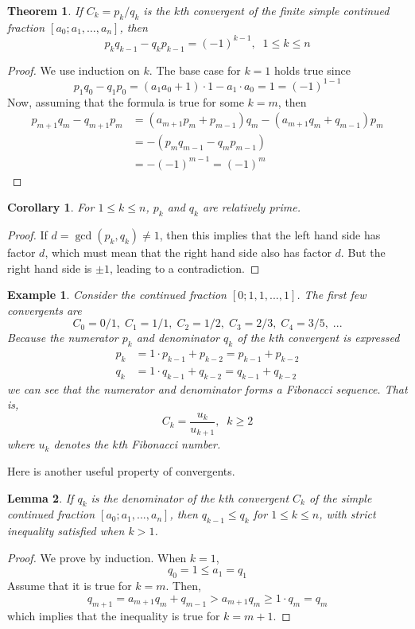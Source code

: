 \documentclass{article}
\newtheorem{theorem}{Theorem}[section]
\newtheorem{lemma}[theorem]{Lemma}
\newtheorem{example}{Example}[section]
\newtheorem{corollary}{Corollary}[theorem]
\theoremstyle{remark}
\theoremstyle{definition}
\begin{document}
\begin{theorem}
If $C_k = p_k / q_k$ is the $k$th convergent of the finite simple continued fraction $[a_0; a_1, \ldots, a_n]$, then 
\[p_k q_{k-1} - q_k p_{k-1} = (-1)^{k-1}, \;\; 1\leq k \leq n\]
\end{theorem}
\begin{proof}
We use induction on $k$. The base case for $k=1$ holds true since
\[p_1 q_0 - q_1 p_0 = (a_1 a_0 + 1) \cdot 1 - a_1 \cdot a_0 = 1 = (-1)^{1-1}\]
Now, assuming that the formula is true for some $k = m$, then 
\begin{align*}
    p_{m+1} q_m - q_{m+1} p_m & = (a_{m+1} p_m + p_{m-1}) q_m - (a_{m+1} q_m + q_{m-1}) p_m \\
    & = - (p_m q_{m-1} - q_m p_{m-1}) \\
    & = - (-1)^{m-1} = (-1)^m
\end{align*}
\end{proof}

\begin{corollary}
For $1 \leq k \leq n$, $p_k$ and $q_k$ are relatively prime. 
\end{corollary}
\begin{proof}
If $d = \gcd(p_k, q_k) \neq 1$, then this implies that the left hand side has factor $d$, which must mean that the right hand side also has factor $d$. But the right hand side is $\pm 1$, leading to a contradiction. 
\end{proof}

\begin{example}
Consider the continued fraction $[0;1,1,...,1]$. The first few convergents are
\[C_0 = 0/1, \; C_1 = 1/1, \; C_2 = 1/2, \; C_3 = 2/3, \; C_4 = 3/5, \; ...\]
Because the numerator $p_k$ and denominator $q_k$ of the $k$th convergent is expressed
\begin{align*}
    p_k & = 1 \cdot p_{k-1} + p_{k-2} = p_{k-1} + p_{k-2} \\
    q_k & = 1 \cdot q_{k-1} + q_{k-2} = q_{k-1} + q_{k-2}
\end{align*}
we can see that the numerator and denominator forms a Fibonacci sequence. That is, 
\[C_k = \frac{u_k}{u_{k+1}}, \;\; k \geq 2\]
where $u_k$ denotes the $k$th Fibonacci number. 
\end{example}

Here is another useful property of convergents.

\begin{lemma}
If $q_k$ is the denominator of the $k$th convergent $C_k$ of the simple continued fraction $[a_0; a_1, ..., a_n]$, then $q_{k-1} \leq q_k$ for $1 \leq k \leq n$, with strict inequality satisfied when $k >1$. 
\end{lemma}
\begin{proof}
We prove by induction. When $k=1$, 
\[q_0 = 1 \leq a_1 = q_1\]
Assume that it is true for $k=m$. Then, 
\[q_{m+1} = a_{m+1} q_m + q_{m-1} > a_{m+1} q_m \geq 1 \cdot q_m = q_m\]
which implies that the inequality is true for $k = m+1$. 
\end{proof}
\end{document}
